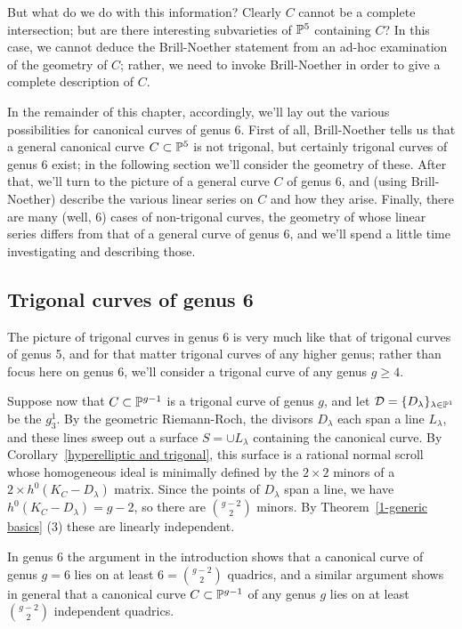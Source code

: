 But what do we do with this information? Clearly $C$ cannot be a complete intersection; but are there interesting subvarieties of ${\mathbb P}^5$ containing $C$? In this case, we cannot deduce the Brill-Noether statement from an ad-hoc examination of the geometry of $C$; rather, we need to invoke Brill-Noether in order to give a complete description of $C$.

In the remainder of this chapter, accordingly, we'll lay out the various possibilities for canonical curves of genus 6. First of all,  Brill-Noether tells us that a general canonical curve $C \subset {\mathbb P}^5$ is not trigonal, but certainly trigonal curves of genus 6 exist; in the following section we'll consider the geometry of these. After that, we'll turn to the picture of a general curve $C$ of genus 6, and (using Brill-Noether) describe the various linear series on $C$ and how they arise. Finally, there are many (well, 6) cases of non-trigonal curves, the geometry of whose linear series differs from that of a general curve of genus 6, and we'll spend a little time investigating and describing those.


\subsection{Trigonal curves of genus 6} The picture of trigonal curves in genus 6 is very much like that of trigonal curves of genus 5, and for that matter trigonal curves of any higher genus; rather than focus here on genus 6, we'll consider a trigonal curve of any genus $g \geq 4$. 



Suppose now that $C \subset {\mathbb P}^{g-1}$ is a trigonal curve of genus $g$, and let ${\cal D} = \{D_\lambda\}_{\lambda \in {\mathbb P}^1}$ be the $g^1_3$. By the geometric Riemann-Roch, the divisors $D_\lambda$ each span a line $L_\lambda$, and these lines sweep out a surface $S = \cup L_\lambda$ containing the canonical curve. By Corollary~\ref{hyperelliptic and trigonal}, this surface is a rational normal scroll whose homogeneous ideal is minimally
defined by the $2\times 2$ minors of a $2\times h^0(K_C - D_\lambda)$ matrix. Since the points of $D_\lambda$ span a line, we have
$h^0(K_C - D_\lambda) = g-2$, so there are ${g-2\choose 2}$ minors. By Theorem~\ref{1-generic basics} (3) these are linearly independent. 

In genus 6 the argument  in the introduction shows that a canonical curve  of genus $g=6$ lies on at least $6 =  {g-2\choose 2}$ quadrics, and a similar
argument shows in general that a canonical curve $C\subset {\mathbb P}^{g-1}$ of any genus $g$ lies on at least $\binom{g-2}{2}$ independent quadrics.
 
